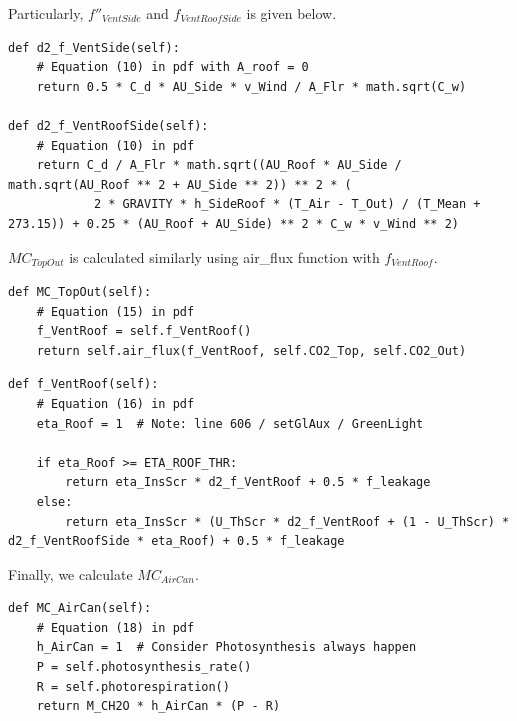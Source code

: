 \documentclass[a4paper]{article}
\numberwithin{equation}{section}
\begin{document}
Particularly, \(f''_{VentSide}\) and \(f_{VentRoofSide}\) is given below.
\begin{mdframed}[leftline=false,rightline=false,backgroundcolor=magenta!10,nobreak=true]
  \begin{verbatim}
def d2_f_VentSide(self):
    # Equation (10) in pdf with A_roof = 0
    return 0.5 * C_d * AU_Side * v_Wind / A_Flr * math.sqrt(C_w)
    
def d2_f_VentRoofSide(self):
    # Equation (10) in pdf
    return C_d / A_Flr * math.sqrt((AU_Roof * AU_Side / math.sqrt(AU_Roof ** 2 + AU_Side ** 2)) ** 2 * (
            2 * GRAVITY * h_SideRoof * (T_Air - T_Out) / (T_Mean + 273.15)) + 0.25 * (AU_Roof + AU_Side) ** 2 * C_w * v_Wind ** 2)
  \end{verbatim}
\end{mdframed}

\(MC_{TopOut}\) is calculated similarly using air\_flux function with \(f_{VentRoof}\).
\begin{mdframed}[leftline=false,rightline=false,backgroundcolor=magenta!10,nobreak=true]
  \begin{verbatim}
def MC_TopOut(self):
    # Equation (15) in pdf
    f_VentRoof = self.f_VentRoof()
    return self.air_flux(f_VentRoof, self.CO2_Top, self.CO2_Out)
  \end{verbatim}
\end{mdframed}

\begin{mdframed}[leftline=false,rightline=false,backgroundcolor=magenta!10,nobreak=true]
  \begin{verbatim}
def f_VentRoof(self):
    # Equation (16) in pdf
    eta_Roof = 1  # Note: line 606 / setGlAux / GreenLight
    
    if eta_Roof >= ETA_ROOF_THR:
        return eta_InsScr * d2_f_VentRoof + 0.5 * f_leakage
    else:
        return eta_InsScr * (U_ThScr * d2_f_VentRoof + (1 - U_ThScr) * d2_f_VentRoofSide * eta_Roof) + 0.5 * f_leakage
  \end{verbatim}
\end{mdframed}

Finally, we calculate \(MC_{AirCan}\).
\begin{mdframed}[leftline=false,rightline=false,backgroundcolor=magenta!10,nobreak=true]
  \begin{verbatim}
def MC_AirCan(self):
    # Equation (18) in pdf
    h_AirCan = 1  # Consider Photosynthesis always happen
    P = self.photosynthesis_rate()
    R = self.photorespiration()
    return M_CH2O * h_AirCan * (P - R)
  \end{verbatim}
\end{mdframed}
\end{document}
